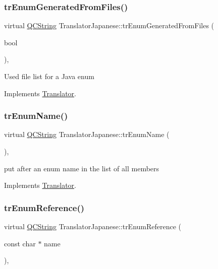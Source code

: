 \subsubsection{\texorpdfstring{trEnumGeneratedFromFiles()}{trEnumGeneratedFromFiles()}}
{\footnotesize\ttfamily virtual \mbox{\hyperlink{class_q_c_string}{Q\+C\+String}} Translator\+Japanese\+::tr\+Enum\+Generated\+From\+Files (\begin{DoxyParamCaption}\item[{bool}]{ }\end{DoxyParamCaption})\hspace{0.3cm}{\ttfamily [inline]}, {\ttfamily [virtual]}}

Used file list for a Java enum 

Implements \mbox{\hyperlink{class_translator}{Translator}}.

\mbox{\label{class_translator_japanese_a7e33d5dda7b42867114222d1c2c86b0b}} 
\subsubsection{\texorpdfstring{trEnumName()}{trEnumName()}}
{\footnotesize\ttfamily virtual \mbox{\hyperlink{class_q_c_string}{Q\+C\+String}} Translator\+Japanese\+::tr\+Enum\+Name (\begin{DoxyParamCaption}{ }\end{DoxyParamCaption})\hspace{0.3cm}{\ttfamily [inline]}, {\ttfamily [virtual]}}

put after an enum name in the list of all members 

Implements \mbox{\hyperlink{class_translator}{Translator}}.

\mbox{\label{class_translator_japanese_a13eadac95c15f7cf42442940a0d5f944}} 
\subsubsection{\texorpdfstring{trEnumReference()}{trEnumReference()}}
{\footnotesize\ttfamily virtual \mbox{\hyperlink{class_q_c_string}{Q\+C\+String}} Translator\+Japanese\+::tr\+Enum\+Reference (\begin{DoxyParamCaption}\item[{const char $\ast$}]{name }\end{DoxyParamCaption})\hspace{0.3cm}{\ttfamily [inline]}, {\ttfamily [virtual]}}

